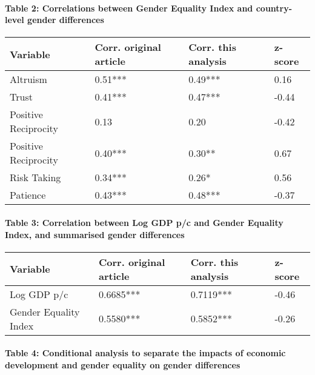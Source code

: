 \documentclass[
  11pt,
]{article}
\begin{document}
\hypertarget{table-2-correlations-between-gender-equality-index-and-country-level-gender-differences}{%
\paragraph{Table 2: Correlations between Gender Equality Index and
country-level gender
differences}\label{table-2-correlations-between-gender-equality-index-and-country-level-gender-differences}}

\begin{longtable}[]{@{}llll@{}}
\toprule
Variable & Corr. original article & Corr. this analysis &
z-score\tabularnewline
\midrule
\endhead
Altruism & 0.51*** & 0.49*** & 0.16\tabularnewline
Trust & 0.41*** & 0.47*** & -0.44\tabularnewline
Positive Reciprocity & 0.13 & 0.20 & -0.42\tabularnewline
Positive Reciprocity & 0.40*** & 0.30** & 0.67\tabularnewline
Risk Taking & 0.34*** & 0.26* & 0.56\tabularnewline
Patience & 0.43*** & 0.48*** & -0.37\tabularnewline
\bottomrule
\end{longtable}

\hypertarget{table-3-correlation-between-log-gdp-pc-and-gender-equality-index-and-summarised-gender-differences}{%
\paragraph{Table 3: Correlation between Log GDP p/c and Gender Equality
Index, and summarised gender
differences}\label{table-3-correlation-between-log-gdp-pc-and-gender-equality-index-and-summarised-gender-differences}}

\begin{longtable}[]{@{}llll@{}}
\toprule
Variable & Corr. original article & Corr. this analysis &
z-score\tabularnewline
\midrule
\endhead
Log GDP p/c & 0.6685*** & 0.7119*** & -0.46\tabularnewline
Gender Equality Index & 0.5580*** & 0.5852*** & -0.26\tabularnewline
\bottomrule
\end{longtable}

\hypertarget{table-4-conditional-analysis-to-separate-the-impacts-of-economic-development-and-gender-equality-on-gender-differences}{%
\paragraph{Table 4: Conditional analysis to separate the impacts of
economic development and gender equality on gender
differences}\label{table-4-conditional-analysis-to-separate-the-impacts-of-economic-development-and-gender-equality-on-gender-differences}}
\end{document}
